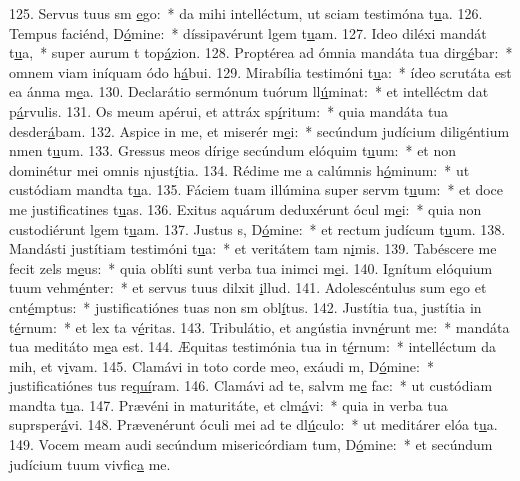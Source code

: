 125. Servus tuus sm \uline{e}go:~* da mihi intelléctum, ut sciam testimóna t\uline{u}a.
126. Tempus faciénd, D\uline{ó}mine:~* díssipavérunt lgem t\uline{u}am.
127. Ideo diléxi mandát t\uline{u}a,~* super aurum t top\uline{á}zion.
128. Proptérea ad ómnia mandáta tua dirg\uline{é}bar:~* omnem viam iníquam ódo h\uline{á}bui.
129. Mirabília testimóni t\uline{u}a:~* ídeo scrutáta est ea ánma m\uline{e}a.
130. Declarátio sermónum tuórum ll\uline{ú}minat:~* et intelléctm dat p\uline{á}rvulis.
131. Os meum apérui, et attráx sp\uline{í}ritum:~* quia mandáta tua desder\uline{á}bam.
132. Aspice in me, et miserér m\uline{e}i:~* secúndum judícium diligéntium nmen t\uline{u}um.
133. Gressus meos dírige secúndum elóquim t\uline{u}um:~* et non dominétur mei omnis njust\uline{í}tia.
134. Rédime me a calúmnis h\uline{ó}minum:~* ut custódiam mandta t\uline{u}a.
135. Fáciem tuam illúmina super servm t\uline{u}um:~* et doce me justificatines t\uline{u}as.
136. Exitus aquárum deduxérunt ócul m\uline{e}i:~* quia non custodiérunt lgem t\uline{u}am.
137. Justus s, D\uline{ó}mine:~* et rectum judícum t\uline{u}um.
138. Mandásti justítiam testimóni t\uline{u}a:~* et veritátem tam n\uline{i}mis.
139. Tabéscere me fecit zels m\uline{e}us:~* quia oblíti sunt verba tua inimci m\uline{e}i.
140. Ignítum elóquium tuum vehm\uline{é}nter:~* et servus tuus dilxit \uline{i}llud.
141. Adolescéntulus sum ego et cnt\uline{é}mptus:~* justificatiónes tuas non sm obl\uline{í}tus.
142. Justítia tua, justítia in t\uline{é}rnum:~* et lex ta v\uline{é}ritas.
143. Tribulátio, et angústia invn\uline{é}runt me:~* mandáta tua meditáto m\uline{e}a est.
144. Æquitas testimónia tua in t\uline{é}rnum:~* intelléctum da mih, et v\uline{i}vam.
145. Clamávi in toto corde meo, exáudi m, D\uline{ó}mine:~* justificatiónes tus re\uline{quí}ram.
146. Clamávi ad te, salvm m\uline{e} fac:~* ut custódiam mandta t\uline{u}a.
147. Prævéni in maturitáte, et clm\uline{á}vi:~* quia in verba tua suprsper\uline{á}vi.
148. Prævenérunt óculi mei ad te dl\uline{ú}culo:~* ut meditárer elóa t\uline{u}a.
149. Vocem meam audi secúndum misericórdiam tum, D\uline{ó}mine:~* et secúndum judícium tuum vivfic\uline{a} me.
